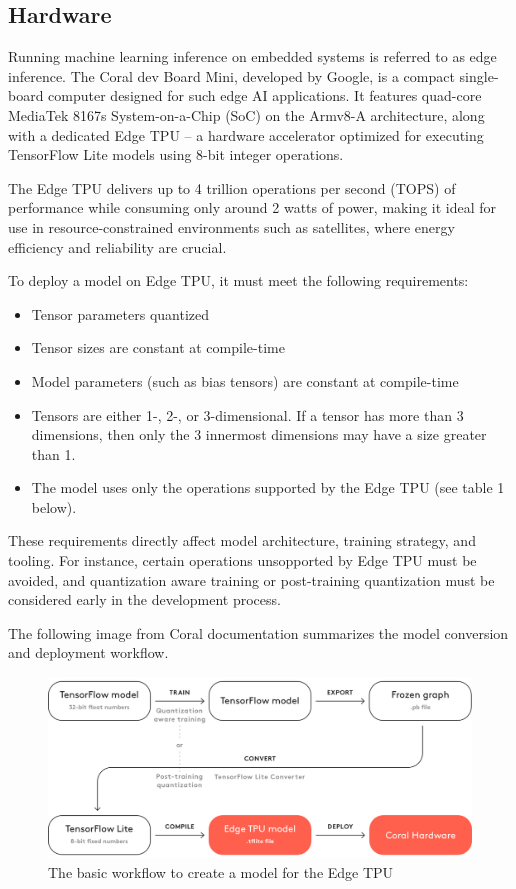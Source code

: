 {\subsection{Hardware}

Running machine learning inference on embedded systems is referred to as edge inference. The Coral dev Board Mini, developed by Google, is a compact single-board computer designed for such edge AI applications. It features quad-core MediaTek 8167s System-on-a-Chip (SoC) on the Armv8-A architecture, along with a dedicated Edge TPU – a hardware accelerator optimized for executing TensorFlow Lite models using 8-bit integer operations.

The Edge TPU delivers up to 4 trillion operations per second (TOPS) of performance while consuming only around 2 watts of power, making it ideal for use in resource-constrained environments such as satellites, where energy efficiency and reliability are crucial.

To deploy a model on Edge TPU, it must meet the following requirements:
\begin{itemize}
    \item Tensor parameters quantized
    \item Tensor sizes are constant at compile-time
    \item Model parameters (such as bias tensors) are constant at compile-time
    \item Tensors are either 1-, 2-, or 3-dimensional. If a tensor has more than 3 dimensions, then only the 3 innermost dimensions may have a size greater than 1.
    \item The model uses only the operations supported by the Edge TPU (see table 1 below). 
\end{itemize}

These requirements directly affect model architecture, training strategy, and tooling. For instance, certain operations unsopported by Edge TPU must be avoided, and quantization aware training or post-training quantization must be considered early in the development process.

The following image from Coral documentation summarizes the model conversion and deployment workflow.

\begin{figure}[H]
  \centering
  \includegraphics[width=\textwidth]{files/Edge_TPU_quantization.png}
  \caption{The basic workflow to create a model for the Edge TPU}
  \label{fig:quantization-chart}
\end{figure}

}
